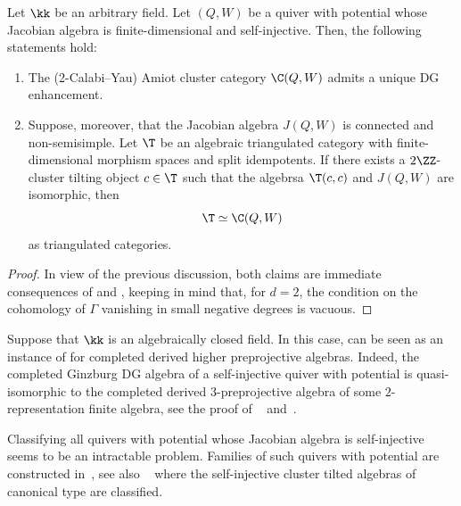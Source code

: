 \documentclass[a4paper]{amsart}
\begin{document}
\begin{theorem}
  \label{thm:recognition_cluster_cat_self-inj_QP}
  Let $\kk$ be an arbitrary field. Let $(Q,W)$ be a quiver with potential whose
  Jacobian algebra is finite-dimensional and self-injective. Then, the following statements hold:
  \begin{enumerate}
  \item The (2-Calabi--Yau) Amiot cluster category $\C(Q,W)$ admits a unique DG
    enhancement.
  \item Suppose, moreover, that the Jacobian algebra $J(Q,W)$ is connected and
    non-semisimple. Let $\T$ be an algebraic triangulated category with
    finite-dimensional morphism spaces and split idempotents. If there exists a
    $2\ZZ$-cluster tilting object $c\in\T$ such that the algebrsa $\T(c,c)$ 
    and $J(Q,W)$ are isomorphic, then
    \[
      \T\simeq\C(Q,W)
    \]
    as triangulated categories.
  \end{enumerate}  
\end{theorem}
\begin{proof}
  In view of the previous discussion, both claims are immediate consequences of
   and ,
  keeping in mind that, for $d=2$, the condition on the cohomology of $\Gamma$
  vanishing in small negative degrees is vacuous.%
\end{proof}

\begin{remark}
  Suppose that $\kk$ is an algebraically closed field. In this case,
   can be seen as an instance of
   for completed derived higher preprojective
  algebras. Indeed, the completed Ginzburg DG algebra of a self-injective quiver
  with potential is quasi-isomorphic to the completed derived $3$-preprojective
  algebra of some $2$-representation finite algebra, see the proof of
  ~\cite[Thm.~3.11(a)]{HI11} and~\cite[Prop.~2.4]{HI11}.
\end{remark}

\begin{remark}
  Classifying all quivers with potential whose Jacobian algebra is
  self-injective seems to be an intractable problem. Families of such quivers
  with potential are constructed in~\cite{HI11,Pas20}, see also
  ~\cite[Thm.~1.3]{Jas15} where the self-injective cluster tilted algebras of
  canonical type are classified.
\end{remark}
\end{document}
